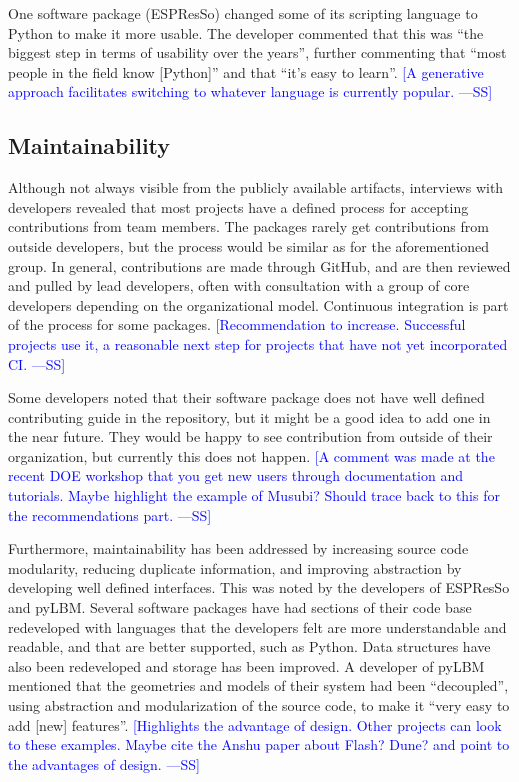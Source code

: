 \documentclass[final, 3p, times, authoryear]{elsarticle}
\newcommand{\authornote}[3]{\textcolor{#1}{[#3 ---#2]}}
\newcommand{\authornote}[3]{}
\newcommand{\wss}[1]{\authornote{blue}{SS}{#1}} %
\begin{document}
One software package (ESPResSo) changed some of its scripting language to Python
to make it more usable. The developer commented that this was ``the biggest step
in terms of usability over the years'', further commenting that ``most people in
the field know [Python]'' and that ``it's easy to learn''.  \wss{A generative
approach facilitates switching to whatever language is currently popular.}

\subsection{Maintainability}

Although not always visible from the publicly available artifacts, interviews
with developers revealed that most projects have a defined process for accepting
contributions from team members. The packages rarely get contributions from
outside developers, but the process would be similar as for the aforementioned
group.  In general, contributions are made through GitHub, and are then reviewed
and pulled by lead developers, often with consultation with a group of core
developers depending on the organizational model. Continuous integration is part
of the process for some packages. \wss{Recommendation to increase.  Successful
projects use it, a reasonable next step for projects that have not yet
incorporated CI.}

Some developers noted that their software package does not have well defined
contributing guide in the repository, but it might be a good idea to add one in
the near future. They would be happy to see contribution from outside of their
organization, but currently this does not happen.  \wss{A comment was made at
the recent DOE workshop that you get new users through documentation and
tutorials.  Maybe highlight the example of Musubi?  Should trace back to this
for the recommendations part.}

Furthermore, maintainability has been addressed by increasing source code
modularity, reducing duplicate information, and improving abstraction by
developing well defined interfaces. This was noted by the developers of ESPResSo
and pyLBM. Several software packages have had sections of their code base
redeveloped with languages that the developers felt are more understandable and
readable, and that are better supported, such as Python. Data structures have
also been redeveloped and storage has been improved. A developer of pyLBM
mentioned that the geometries and models of their system had been ``decoupled'',
using abstraction and modularization of the source code, to make it ``very easy
to add [new] features''.  \wss{Highlights the advantage of design.  Other
projects can look to these examples.  Maybe cite the Anshu paper about Flash?
Dune?  and point to the advantages of design.}
\end{document}

